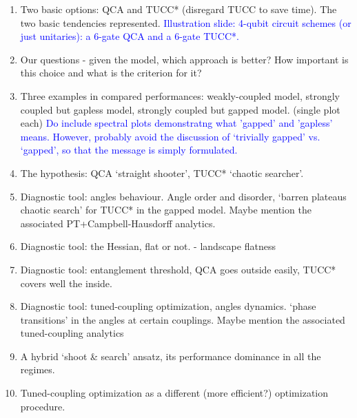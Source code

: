 \documentclass[10pt, a4paper]{article}
\def\blue{\textcolor{blue}}
\begin{document}
\begin{enumerate}
\begin{enumerate}
	\item Two basic options: QCA and TUCC* (disregard TUCC to save time). The two basic tendencies represented. \blue{Illustration slide: 4-qubit circuit schemes (or just unitaries): a 6-gate QCA and a 6-gate TUCC*.}
	\item Our questions - given the model, which approach is better? How important is this choice and what is the criterion for it?
	\item Three examples in compared performances: weakly-coupled model, strongly coupled but gapless model, strongly coupled but gapped model. (single plot each) \blue{Do include spectral plots demonstratng what 'gapped' and 'gapless' means. However, probably avoid the discussion of `trivially gapped' vs. `gapped', so that the message is simply formulated.}
	\item The hypothesis: QCA `straight shooter', TUCC* `chaotic searcher'.
	\item Diagnostic tool: angles behaviour. Angle order and disorder, `barren plateaus chaotic search' for TUCC* in the gapped model. Maybe mention the associated PT+Campbell-Hausdorff analytics.
	\item Diagnostic tool: the Hessian, flat or not. - landscape flatness
	\item Diagnostic tool: entanglement threshold, QCA goes outside easily, TUCC* covers well the inside.
	\item Diagnostic tool: tuned-coupling optimization, angles dynamics. `phase transitions' in the angles at certain couplings.  Maybe mention the associated tuned-coupling analytics
	\item A hybrid `shoot \& search' ansatz, its performance dominance in all the regimes.
	\item Tuned-coupling optimization as a different (more efficient?) optimization procedure.
\end{enumerate}

\end{enumerate}
\end{document}
